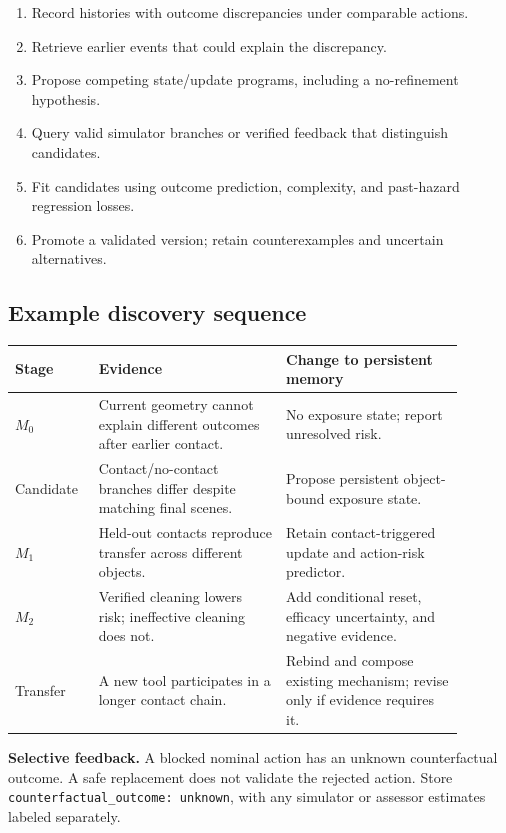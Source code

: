 \documentclass[10pt]{article}
\begin{document}
\begin{enumerate}
\item Record histories with outcome discrepancies under comparable actions.
\item Retrieve earlier events that could explain the discrepancy.
\item Propose competing state/update programs, including a no-refinement hypothesis.
\item Query valid simulator branches or verified feedback that distinguish candidates.
\item Fit candidates using outcome prediction, complexity, and past-hazard regression losses.
\item Promote a validated version; retain counterexamples and uncertain alternatives.
\end{enumerate}

\subsection{Example discovery sequence}
\begin{center}
\small
\begin{tabular}{p{0.15\linewidth}p{0.38\linewidth}p{0.36\linewidth}}
\toprule
Stage & Evidence & Change to persistent memory \\
\midrule
$M_0$ & Current geometry cannot explain different outcomes after earlier contact. & No exposure state; report unresolved risk. \\
Candidate & Contact/no-contact branches differ despite matching final scenes. & Propose persistent object-bound exposure state. \\
$M_1$ & Held-out contacts reproduce transfer across different objects. & Retain contact-triggered update and action-risk predictor. \\
$M_2$ & Verified cleaning lowers risk; ineffective cleaning does not. & Add conditional reset, efficacy uncertainty, and negative evidence. \\
Transfer & A new tool participates in a longer contact chain. & Rebind and compose existing mechanism; revise only if evidence requires it. \\
\bottomrule
\end{tabular}
\end{center}

\textbf{Selective feedback.} A blocked nominal action has an unknown counterfactual outcome. A safe replacement does not validate the rejected action. Store \texttt{counterfactual\_outcome: unknown}, with any simulator or assessor estimates labeled separately.
\end{document}
